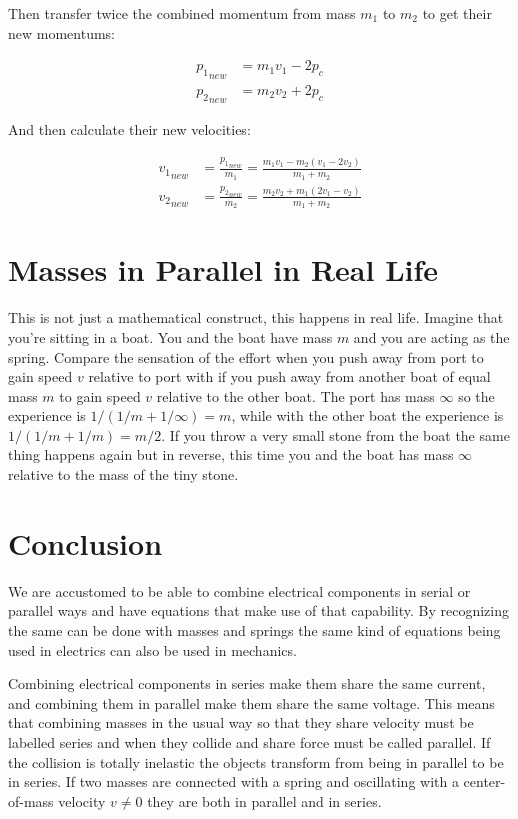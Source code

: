 \documentclass[]{elementary-physics}
\begin{document}
Then transfer twice the combined momentum from mass $m_1$ to $m_2$ to get their new momentums:

\begin{subequations}
\begin{align}
{p_1}_{new} &= m_1 v_1 - 2 p_c \\
{p_2}_{new} &= m_2 v_2 + 2 p_c
\end{align}
\end{subequations}

And then calculate their new velocities:

\begin{subequations}
\begin{align}
{v_1}_{new} &= \frac{{p_1}_{new}}{m_1} = \frac{m_1 v_1 - m_2(v_1 - 2 v_2)}{m_1 + m_2} \\
{v_2}_{new} &= \frac{{p_2}_{new}}{m_2} = \frac{m_2 v_2 + m_1(2 v_1 - v_2)}{m_1 + m_2}
\end{align}
\end{subequations}

\section{Masses in Parallel in Real Life}

This is not just a mathematical construct, this happens in real life.
Imagine that you're sitting in a boat.
You and the boat have mass $m$ and you are acting as the spring.
Compare the sensation of the effort when you push away from port to gain speed $v$ relative to port with if you push away from another boat of equal mass $m$ to gain speed $v$ relative to the other boat.
The port has mass $\infty$ so the experience is $1/(1/m + 1/\infty) = m$, while with the other boat the experience is $1/(1/m + 1/m) = m/2$.
If you throw a very small stone from the boat the same thing happens again but in reverse, this time you and the boat has mass $\infty$ relative to the mass of the tiny stone.

\section{Conclusion}

We are accustomed to be able to combine electrical components in serial or parallel ways and have equations that make use of that capability.
By recognizing the same can be done with masses and springs the same kind of equations being used in electrics can also be used in mechanics.

Combining electrical components in series make them share the same current, and combining them in parallel make them share the same voltage.
This means that combining masses in the usual way so that they share velocity must be labelled series and when they collide and share force must be called parallel.
If the collision is totally inelastic the objects transform from being in parallel to be in series.
If two masses are connected with a spring and oscillating with a center-of-mass velocity $v \neq 0$ they are both in parallel and in series.
\end{document}
